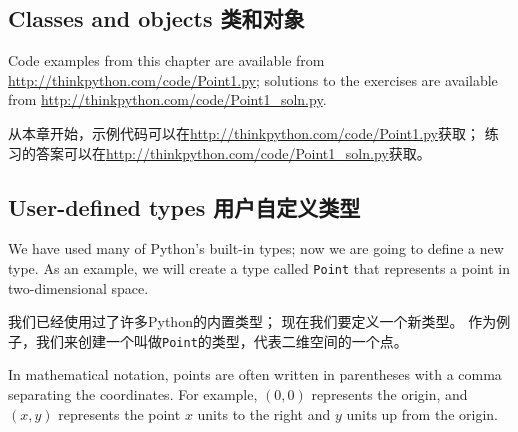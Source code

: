 \documentclass[10pt]{book}
\begin{document}
\begin{CJK}{UTF8}{gbsn}





\chapter{Classes and objects 类和对象}

Code examples from this chapter are available from
\url{http://thinkpython.com/code/Point1.py}; solutions
to the exercises are available from
\url{http://thinkpython.com/code/Point1_soln.py}.

从本章开始，示例代码可以在\url{http://thinkpython.com/code/Point1.py}获取；
练习的答案可以在\url{http://thinkpython.com/code/Point1_soln.py}获取。

\section{User-defined types 用户自定义类型}
\label{point}

We have used many of Python's built-in types; now we are going
to define a new type.  As an example, we will create a type
called {\tt Point} that represents a point in two-dimensional
space.

我们已经使用过了许多Python的内置类型；
现在我们要定义一个新类型。
作为例子，我们来创建一个叫做{\tt Point}的类型，代表二维空间的一个点。

In mathematical notation, points are often written in
parentheses with a comma separating the coordinates. For example,
$(0,0)$ represents the origin, and $(x,y)$ represents the
point $x$ units to the right and $y$ units up from the origin.


\end{CJK}
\end{document}

